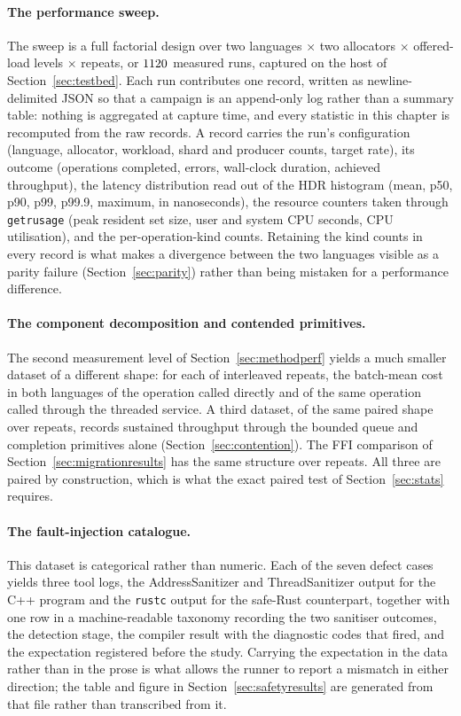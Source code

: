 \documentclass[english,twoside,openright,a4paper,censored,csm,software-track-2020]{HYthesisML}
\begin{document}
\paragraph{The performance sweep.}
The sweep is a full factorial design over two languages $\times$ two allocators $\times$
\NLoadLevels{} offered-load levels $\times$ \NRepeats{} repeats, or $1120$ measured runs,
captured on the host of Section~\ref{sec:testbed}. Each run contributes one
record, written as newline-delimited JSON so that a campaign is an append-only log rather than a
summary table: nothing is aggregated at capture time, and every statistic in this chapter is
recomputed from the raw records. A record carries the run's configuration (language, allocator,
workload, shard and producer counts, target rate), its outcome (operations completed, errors,
wall-clock duration, achieved throughput), the latency distribution read out of the HDR
histogram (mean, p50, p90, p99, p99.9, maximum, in nanoseconds), the resource counters taken
through \texttt{getrusage} (peak resident set size, user and system CPU seconds, CPU
utilisation), and the per-operation-kind counts. Retaining the kind counts in every record is
what makes a divergence between the two languages visible as a parity failure
(Section~\ref{sec:parity}) rather than being mistaken for a performance difference.

\paragraph{The component decomposition and contended primitives.}
The second measurement level of Section~\ref{sec:methodperf} yields a much smaller dataset of a
different shape: for each of \BudgetRepeats{} interleaved repeats, the batch-mean cost in both
languages of the operation called directly and of the same operation called through the threaded
service. A third dataset, of the same paired shape over \ContentionRepeats{} repeats, records
sustained throughput through the bounded queue and completion primitives alone
(Section~\ref{sec:contention}). The FFI comparison of Section~\ref{sec:migrationresults} has the
same structure over \FfiOpRepeats{} repeats. All three are paired by construction, which is what
the exact paired test of Section~\ref{sec:stats} requires.

\paragraph{The fault-injection catalogue.}
This dataset is categorical rather than numeric. Each of the seven defect cases yields three tool
logs, the AddressSanitizer and ThreadSanitizer output for the C++ program and the \texttt{rustc}
output for the safe-Rust counterpart, together with one row in a machine-readable taxonomy
recording the two sanitiser outcomes, the detection stage, the compiler result with the
diagnostic codes that fired, and the expectation registered before the study. Carrying the
expectation in the data rather than in the prose is what allows the runner to report a mismatch
in either direction; the table and figure in Section~\ref{sec:safetyresults} are generated from
that file rather than transcribed from it.
\end{document}

